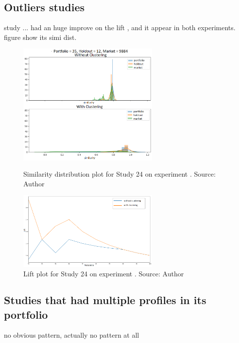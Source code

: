 \subsection{Outliers studies}

study ... had an huge improve on the lift , and it appear in both experiments. figure show its simi dist.

\begin{figure}[h]
   \centering
   \includegraphics[width=7cm]{fig/ch4-outlier-study-24-exp-2.png}
   \caption{Similarity distribution plot for Study 24 on experiment \nameExperimentII{}. Source: Author}
   \label{fig:outlier-study-24-exp-2}

   \includegraphics[width=7cm]{fig/ch4-outlier-study-24-lift-exp-2.png}
   \caption{Lift plot for Study 24 on experiment \nameExperimentII{}. Source: Author}
   \label{fig:outlier-study-24-lift-exp-2}
\end{figure}



\subsection{Studies that had multiple profiles in its portfolio}

no obvious pattern, actually no pattern at all

